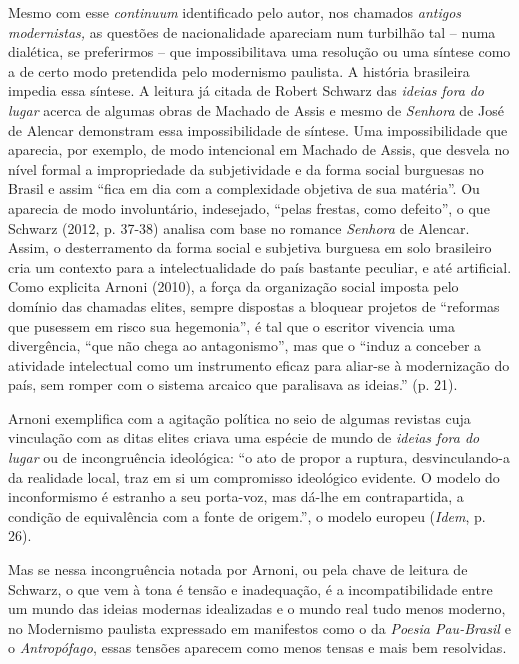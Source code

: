 Mesmo com esse \emph{continuum} identificado pelo autor, nos chamados
\emph{antigos modernistas,} as questões de nacionalidade apareciam num
turbilhão tal -- numa dialética, se preferirmos -- que impossibilitava
uma resolução ou uma síntese como a de certo modo pretendida pelo
modernismo paulista. A história brasileira impedia essa síntese. A
leitura já citada de Robert Schwarz das \emph{ideias} \emph{fora}
\emph{do} \emph{lugar} acerca de algumas obras de Machado de Assis e
mesmo de \emph{Senhora} de José de Alencar demonstram essa
impossibilidade de síntese. Uma impossibilidade que aparecia, por
exemplo, de modo intencional em Machado de Assis, que desvela no nível
formal a impropriedade da subjetividade e da forma social burguesas no
Brasil e assim ``fica em dia com a complexidade objetiva de sua
matéria''. Ou aparecia de modo involuntário, indesejado, ``pelas
frestas, como defeito'', o que Schwarz (2012, p. 37-38) analisa com base
no romance \emph{Senhora} de Alencar. Assim, o desterramento da forma
social e subjetiva burguesa em solo brasileiro cria um contexto para a
intelectualidade do país bastante peculiar, e até artificial. Como
explicita Arnoni (2010), a força da organização social imposta pelo
domínio das chamadas elites, sempre dispostas a bloquear projetos de
``reformas que pusessem em risco sua hegemonia'', é tal que o escritor
vivencia uma divergência, ``que não chega ao antagonismo'', mas que o
``induz a conceber a atividade intelectual como um instrumento eficaz
para aliar-se à modernização do país, sem romper com o sistema arcaico
que paralisava as ideias.'' (p. 21).

Arnoni exemplifica com a agitação política no seio de algumas revistas
cuja vinculação com as ditas elites criava uma espécie de mundo de
\emph{ideias fora do lugar} ou de incongruência ideológica: ``o ato de
propor a ruptura, desvinculando-a da realidade local, traz em si um
compromisso ideológico evidente. O modelo do inconformismo é estranho a
seu porta-voz, mas dá-lhe em contrapartida, a condição de equivalência
com a fonte de origem.'', o modelo europeu (\emph{Idem}, p. 26).

Mas se nessa incongruência notada por Arnoni, ou pela chave de leitura
de Schwarz, o que vem à tona é tensão e inadequação, é a
incompatibilidade entre um mundo das ideias modernas idealizadas e o
mundo real tudo menos moderno, no Modernismo paulista expressado em
manifestos como o da \emph{Poesia Pau-Brasil} e o \emph{Antropófago},
essas tensões aparecem como menos tensas e mais bem resolvidas.


